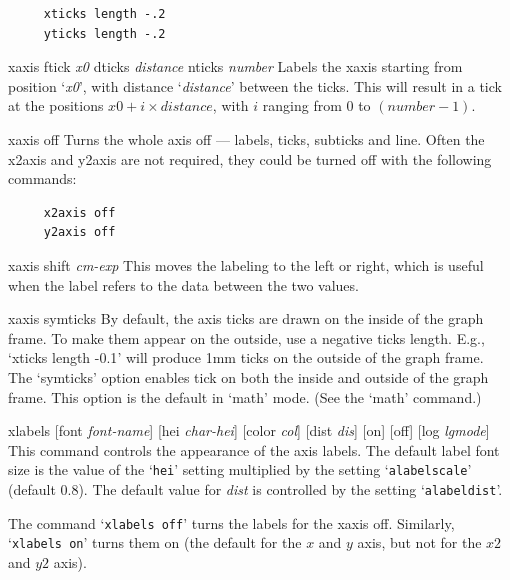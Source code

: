 \begin{commanddescription}
\preglecode{}
\begin{Verbatim}
     xticks length -.2
     yticks length -.2
\end{Verbatim}
\postglecode{}

\item[{\sf xaxis ftick {\it x0} dticks {\it distance} nticks {\it number}}]
Labels the xaxis starting from position `{\it x0}', with distance `{\it distance}' between the ticks. This will result in a tick at the positions $\mathit{x0} + i \times \mathit{distance}$, with $i$ ranging from 0 to $(\mathit{number}-1)$.

\item[{\sf xaxis off}  ]
Turns the whole axis off --- labels, ticks, subticks and line.
Often the x2axis and y2axis are not required, they could be
turned off with the following commands:

\preglecode{}
\begin{Verbatim}
     x2axis off
     y2axis off
\end{Verbatim}
\postglecode{}

\item[{\sf xaxis shift {\it cm-exp}}  ]
This moves the labeling to the left or right, which is useful when
the label refers to the data between the two values.

\item[{\sf xaxis symticks}]
By default, the axis ticks are drawn on the inside of the graph frame. To make them appear on the outside, use a negative ticks length. E.g., `{\sf xticks length -0.1}' will produce 1mm ticks on the outside of the graph frame. The `symticks' option enables tick on both the inside and outside of the graph frame. This option is the default in `math' mode. (See the `{\sf math}' command.)

\item[{\sf xlabels [font {\it font-name}] [hei {\it char-hei}] [color {\it col}] [dist {\it dis}] [on] [off] [log {\it lgmode}]}]
This command controls the appearance of the axis labels. The default label font size is the value of the `\texttt{hei}' setting multiplied by the setting `\texttt{alabelscale}' (default 0.8). The default value for {\it dist} is controlled by the setting `\texttt{alabeldist}'.

The command `\texttt{xlabels off}' turns the labels for the xaxis off. Similarly, `\texttt{xlabels on}' turns them on (the default for the $x$ and $y$ axis, but not for the $x2$ and $y2$ axis).


\end{commanddescription}
